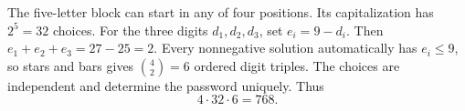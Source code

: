 The five-letter block can start in any of four positions. Its capitalization has $2^5=32$ choices. For the three digits $d_1,d_2,d_3$, set $e_i=9-d_i$. Then $e_1+e_2+e_3=27-25=2$. Every nonnegative solution automatically has $e_i\le9$, so stars and bars gives $\binom42=6$ ordered digit triples. The choices are independent and determine the password uniquely. Thus
\[
\boxed{4\cdot32\cdot6=768}.
\]
